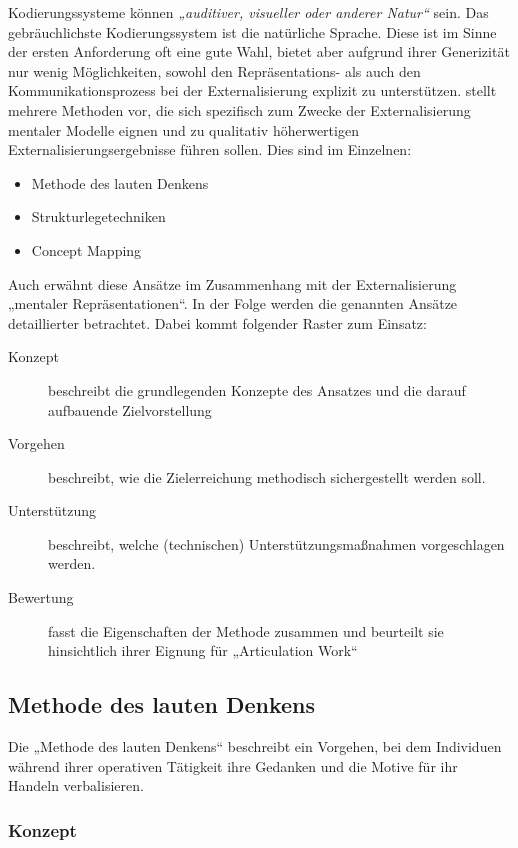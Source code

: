 Kodierungssysteme können \emph{„auditiver, visueller oder anderer Natur“}\citep[][S. 155]{Seel91} sein. Das gebräuchlichste Kodierungssystem ist die natürliche Sprache. Diese ist im Sinne der ersten Anforderung oft eine gute Wahl, bietet aber aufgrund ihrer Generizität nur wenig Möglichkeiten, sowohl den Repräsentations- als auch den Kommunikationsprozess bei der Externalisierung explizit zu unterstützen. \citet{Ifenthaler06} stellt mehrere Methoden vor, die sich spezifisch zum Zwecke der Externalisierung mentaler Modelle eignen und zu qualitativ höherwertigen Externalisierungsergebnisse führen sollen. Dies sind im Einzelnen:
\begin{itemize}
	\item Methode des lauten Denkens
	\item Strukturlegetechniken
	\item Concept Mapping
\end{itemize}

Auch \citep{Huss03} erwähnt diese Ansätze im Zusammenhang mit der Externalisierung „mentaler Repräsentationen“. In der Folge werden die genannten Ansätze detaillierter betrachtet. Dabei kommt folgender Raster zum Einsatz:
\begin{description}
	\item[Konzept] beschreibt die grundlegenden Konzepte des Ansatzes und die darauf aufbauende Zielvorstellung
	\item[Vorgehen] beschreibt, wie die Zielerreichung methodisch sichergestellt werden soll. 
	\item[Unterstützung] beschreibt, welche (technischen) Unterstützungsmaßnahmen vorgeschlagen werden.
	\item[Bewertung] fasst die Eigenschaften der Methode zusammen und beurteilt sie hinsichtlich ihrer Eignung für „Articulation Work“
\end{description}

\subsection{Methode des lauten Denkens} %
\label{sub:methode_des_lauten_denkens}

Die „Methode des lauten Denkens“ \citep{Van-Someren94} beschreibt ein Vorgehen, bei dem Individuen während ihrer operativen Tätigkeit ihre Gedanken und die Motive für ihr Handeln verbalisieren. 

\subsubsection{Konzept}

